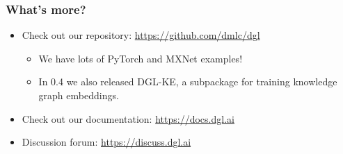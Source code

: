 \documentclass[10pt,aspectratio=169]{beamer}
\begin{document}
	\begin{frame}
		\frametitle{What's more?}
		\begin{itemize}
			\item Check out our repository: \url{https://github.com/dmlc/dgl}
			\begin{itemize}
				\item We have lots of PyTorch and MXNet examples!
				\item In 0.4 we also released DGL-KE, a subpackage for training knowledge graph embeddings.
			\end{itemize}
			\item Check out our documentation: \url{https://docs.dgl.ai}
			\item Discussion forum: \url{https://discuss.dgl.ai}
		\end{itemize}
	\end{frame}
\end{document}
